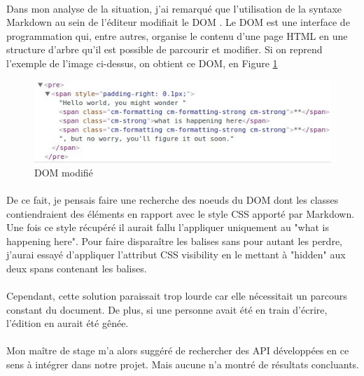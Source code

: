 \documentclass[12pt]{article}
\begin{document}
\paragraph{}
Dans mon analyse de la situation, j'ai remarqué que l'utilisation de la syntaxe Markdown au sein de l'éditeur modifiait le DOM \cite{dom}. Le DOM est une interface de programmation qui, entre autres, organise le contenu d'une page HTML en une structure d'arbre qu'il est possible de parcourir et modifier. Si on reprend l'exemple de l'image ci-dessus, on obtient ce DOM, en Figure \ref{fig:gallery4}
\begin{figure}[H]
    \centering
    \includegraphics[scale=0.95]{gallery/modified_dom.jpg}
    \caption[nom dans le sommaire]{DOM modifié}
    \label{fig:gallery4}
\end{figure}
\paragraph{}
De ce fait, je pensais faire une recherche des noeuds du DOM dont les classes contiendraient des éléments en rapport avec le style CSS apporté par Markdown. Une fois ce style récupéré il aurait fallu l'appliquer uniquement au "what is happening here". Pour faire disparaître les balises sans pour autant les perdre, j'aurai essayé d'appliquer l'attribut CSS visibility en le mettant à "hidden" aux deux spans contenant les balises.
\paragraph{}
Cependant, cette solution paraissait trop lourde car elle nécessitait un parcours constant du document. De plus, si une personne avait été en train d'écrire, l'édition en aurait été gênée.

\paragraph{}
Mon maître de stage m'a alors suggéré de rechercher des API développées en ce sens à intégrer dans notre projet. Mais aucune n'a montré de résultats concluants.
\end{document}
